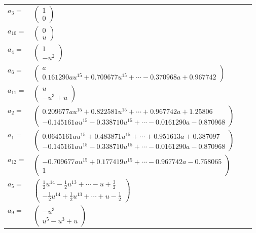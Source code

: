 \documentclass[1p]{elsarticle_modified}
\theoremstyle{definition}
\begin{document}
\begin{tabular}{m{7pt} m{180pt} m{7pt} m{180pt} }
\flushright $a_{3}=$&$\begin{pmatrix}1\\0\end{pmatrix}$ \\
\flushright $a_{10}=$&$\begin{pmatrix}0\\u\end{pmatrix}$ \\
\flushright $a_{4}=$&$\begin{pmatrix}1\\- u^2\end{pmatrix}$ \\
\flushright $a_{6}=$&$\begin{pmatrix}a\\0.161290 a u^{15}+0.709677 u^{15}+\cdots-0.370968 a+0.967742\end{pmatrix}$ \\
\flushright $a_{11}=$&$\begin{pmatrix}u\\- u^3+u\end{pmatrix}$ \\
\flushright $a_{2}=$&$\begin{pmatrix}0.209677 a u^{15}+0.822581 u^{15}+\cdots+0.967742 a+1.25806\\-0.145161 a u^{15}-0.338710 u^{15}+\cdots-0.0161290 a-0.870968\end{pmatrix}$ \\
\flushright $a_{1}=$&$\begin{pmatrix}0.0645161 a u^{15}+0.483871 u^{15}+\cdots+0.951613 a+0.387097\\-0.145161 a u^{15}-0.338710 u^{15}+\cdots-0.0161290 a-0.870968\end{pmatrix}$ \\
\flushright $a_{12}=$&$\begin{pmatrix}-0.709677 a u^{15}+0.177419 u^{15}+\cdots-0.967742 a-0.758065\\1\end{pmatrix}$ \\
\flushright $a_{5}=$&$\begin{pmatrix}\frac{1}{2} u^{14}-\frac{1}{2} u^{13}+\cdots- u+\frac{3}{2}\\-\frac{1}{2} u^{14}+\frac{1}{2} u^{13}+\cdots+u-\frac{1}{2}\end{pmatrix}$ \\
\flushright $a_{9}=$&$\begin{pmatrix}- u^3\\u^5- u^3+u\end{pmatrix}$ \\

\end{tabular}
\end{document}
